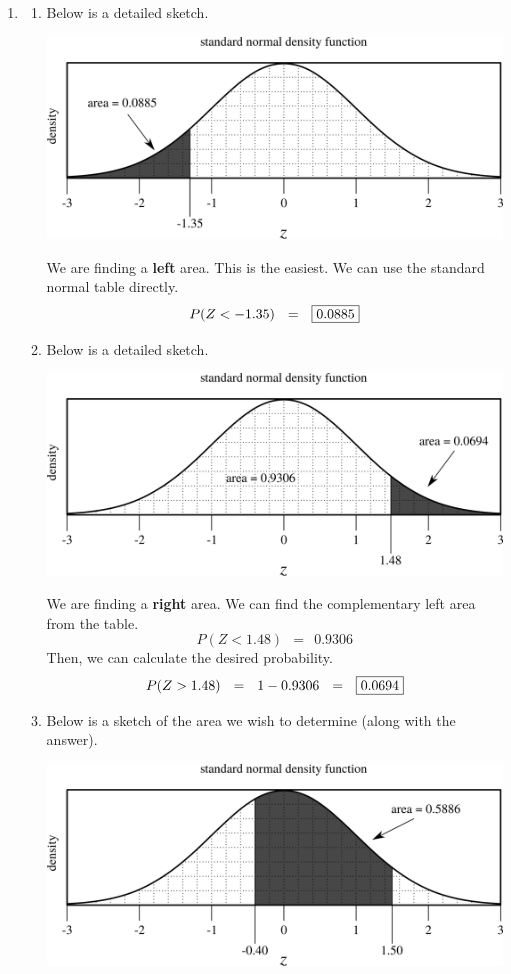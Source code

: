 \documentclass[12pt,letterpaper]{article}
\begin{document}
\begin{enumerate}
\setcounter{enumi}{0}
\item \begin{enumerate}
\item Below is a detailed sketch.
\begin{center}
\includegraphics[scale=0.8]{figures/hw3p1a.png}
\end{center}
We are finding a {\bf left} area. This is the easiest. We can use the standard normal table directly.
$$P(Z<-1.35)~~ =~~ \fbox{0.0885} $$
\vfill
\item Below is a detailed sketch.
\begin{center}
\includegraphics[scale=0.8]{figures/hw3p1b.png}
\end{center}
We are finding a {\bf right} area. We can find the complementary left area from the table.
$$P(Z<1.48)~~ =~~ 0.9306 $$
Then, we can calculate the desired probability.
$$P(Z>1.48)~~ =~~ 1-0.9306 ~~=~~ \fbox{0.0694} $$
\vfill
\newpage
\item Below is a sketch of the area we wish to determine (along with the answer).
\begin{center}
\includegraphics[scale=0.8]{figures/hw3p1c.png}

\end{center}
\end{enumerate}
\end{enumerate}
\end{document}
